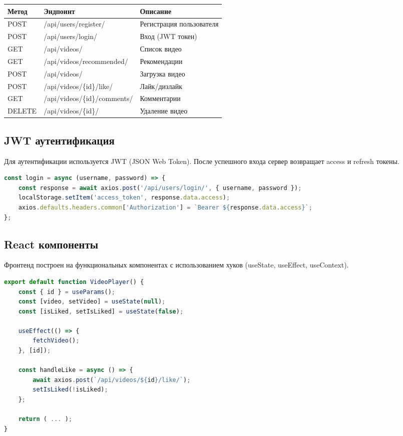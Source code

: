 \documentclass[12pt]{article}
\begin{document}
\begin{longtable}{|p{3cm}|p{4cm}|p{7cm}|}
\hline
\textbf{Метод} & \textbf{Эндпоинт} & \textbf{Описание} \\
\hline
POST & /api/users/register/ & Регистрация пользователя \\
\hline
POST & /api/users/login/ & Вход (JWT токен) \\
\hline
GET & /api/videos/ & Список видео \\
\hline
GET & /api/videos/recommended/ & Рекомендации \\
\hline
POST & /api/videos/ & Загрузка видео \\
\hline
POST & /api/videos/\{id\}/like/ & Лайк/дизлайк \\
\hline
GET & /api/videos/\{id\}/comments/ & Комментарии \\
\hline
DELETE & /api/videos/\{id\}/ & Удаление видео \\
\hline
\end{longtable}

\subsection{JWT аутентификация}

Для аутентификации используется JWT (JSON Web Token). После успешного входа сервер возвращает access и refresh токены.

\begin{lstlisting}[language=JavaScript, caption=Сохранение токена на клиенте]
const login = async (username, password) => {
    const response = await axios.post('/api/users/login/', { username, password });
    localStorage.setItem('access_token', response.data.access);
    axios.defaults.headers.common['Authorization'] = `Bearer ${response.data.access}`;
};
\end{lstlisting}

\subsection{React компоненты}

Фронтенд построен на функциональных компонентах с использованием хуков (useState, useEffect, useContext).

\begin{lstlisting}[language=JavaScript, caption=Пример функционального компонента]
export default function VideoPlayer() {
    const { id } = useParams();
    const [video, setVideo] = useState(null);
    const [isLiked, setIsLiked] = useState(false);
    
    useEffect(() => {
        fetchVideo();
    }, [id]);
    
    const handleLike = async () => {
        await axios.post(`/api/videos/${id}/like/`);
        setIsLiked(!isLiked);
    };
    
    return ( ... );
}
\end{lstlisting}
\end{document}
